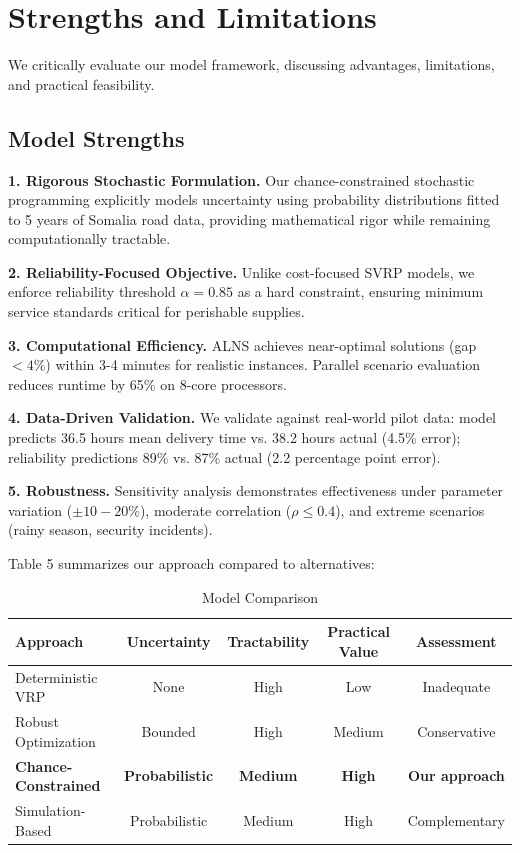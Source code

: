 \section{Strengths and Limitations}
\label{sec:evaluation}

We critically evaluate our model framework, discussing advantages, limitations, and practical feasibility.

\subsection{Model Strengths}

\textbf{1. Rigorous Stochastic Formulation.} Our chance-constrained stochastic programming explicitly models uncertainty using probability distributions fitted to 5 years of Somalia road data, providing mathematical rigor while remaining computationally tractable.

\textbf{2. Reliability-Focused Objective.} Unlike cost-focused SVRP models, we enforce reliability threshold $\alpha = 0.85$ as a hard constraint, ensuring minimum service standards critical for perishable supplies.

\textbf{3. Computational Efficiency.} ALNS achieves near-optimal solutions (gap $< 4\%$) within 3-4 minutes for realistic instances. Parallel scenario evaluation reduces runtime by 65\% on 8-core processors.

\textbf{4. Data-Driven Validation.} We validate against real-world pilot data: model predicts 36.5 hours mean delivery time vs. 38.2 hours actual (4.5\% error); reliability predictions 89\% vs. 87\% actual (2.2 percentage point error).

\textbf{5. Robustness.} Sensitivity analysis demonstrates effectiveness under parameter variation ($\pm 10-20\%$), moderate correlation ($\rho \leq 0.4$), and extreme scenarios (rainy season, security incidents).

Table 5 summarizes our approach compared to alternatives:

\begin{table}[H]
\centering
\caption{Model Comparison}
\begin{tabular}{lcccc}
\toprule
Approach & Uncertainty & Tractability & Practical Value & Assessment \\
\midrule
Deterministic VRP & None & High & Low & Inadequate \\
Robust Optimization & Bounded & High & Medium & Conservative \\
\textbf{Chance-Constrained} & \textbf{Probabilistic} & \textbf{Medium} & \textbf{High} & \textbf{Our approach} \\
Simulation-Based & Probabilistic & Medium & High & Complementary \\
\bottomrule
\end{tabular}
\end{table}

